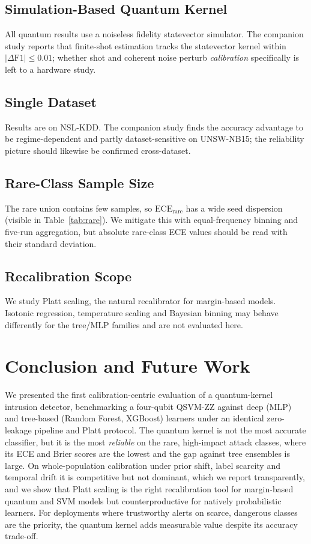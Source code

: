 \documentclass[journal]{IEEEtran}
\newcommand{\ZZ}{\textsc{ZZ}}
\newcommand{\QSVM}{QSVM-\ZZ}
\newcommand{\ECE}{\mathrm{ECE}}
\begin{document}
\subsection{Simulation-Based Quantum Kernel}
All quantum results use a noiseless fidelity statevector simulator. The
companion study reports that finite-shot estimation tracks the
statevector kernel within $|\Delta\mathrm{F1}|\le0.01$; whether shot and
coherent noise perturb \emph{calibration} specifically is left to a
hardware study.

\subsection{Single Dataset}
Results are on NSL-KDD. The companion study finds the accuracy advantage
to be regime-dependent and partly dataset-sensitive on UNSW-NB15; the
reliability picture should likewise be confirmed cross-dataset.

\subsection{Rare-Class Sample Size}
The rare union contains few samples, so $\ECE_{\text{rare}}$ has a wide
seed dispersion (visible in Table~\ref{tab:rare}). We mitigate this with
equal-frequency binning and five-run aggregation, but absolute
rare-class ECE values should be read with their standard deviation.

\subsection{Recalibration Scope}
We study Platt scaling, the natural recalibrator for margin-based models.
Isotonic regression, temperature scaling and Bayesian binning may behave
differently for the tree/MLP families and are not evaluated here.

\section{Conclusion and Future Work}\label{sec:conclusion}
We presented the first calibration-centric evaluation of a quantum-kernel
intrusion detector, benchmarking a four-qubit \QSVM{} against deep (MLP)
and tree-based (Random Forest, XGBoost) learners under an identical
zero-leakage pipeline and Platt protocol. The quantum kernel is not the
most accurate classifier, but it is the most \emph{reliable} on the rare,
high-impact attack classes, where its ECE and Brier scores are the lowest
and the gap against tree ensembles is large. On whole-population
calibration under prior shift, label scarcity and temporal drift it is
competitive but not dominant, which we report transparently, and we show that Platt
scaling is the right recalibration tool for margin-based quantum and SVM
models but counterproductive for natively probabilistic learners. For
deployments where trustworthy alerts on scarce, dangerous classes are the
priority, the quantum kernel adds measurable value despite its accuracy
trade-off.
\end{document}
